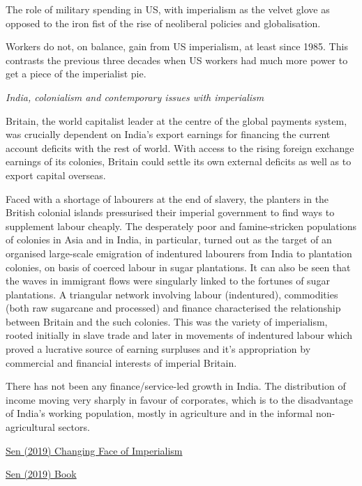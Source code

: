 \documentclass[
]{book}
\begin{document}
The role of military spending in US, with imperialism as the velvet glove as opposed to the iron fist of the rise of neoliberal policies and globalisation.

Workers do not, on balance, gain from US imperialism, at least since 1985. This contrasts the previous three decades when US workers had much more power to get a piece of the imperialist pie.

\emph{India, colonialism and contemporary issues with imperialism}

Britain, the world capitalist leader at the centre of the global payments system, was crucially dependent on India's export earnings for financing the current account deficits with the rest of world. With access to the rising foreign exchange earnings of its colonies, Britain could settle its own external deficits as well as to export capital overseas.

Faced with a shortage of labourers at the end of slavery, the planters in the British colonial islands pressurised their imperial government to find ways to supplement labour cheaply. The desperately poor and famine-stricken populations of colonies in Asia and in India, in particular, turned out as the target of an organised large-scale emigration of indentured labourers from India to plantation colonies, on basis of coerced labour in sugar plantations. It can also be seen that the waves in immigrant flows were singularly linked to the fortunes of sugar plantations. A triangular network involving labour (indentured), commodities (both raw sugarcane and processed) and finance characterised the relationship between Britain and the such colonies. This was the variety of imperialism, rooted initially in slave trade and later in movements of indentured labour which proved a lucrative source of earning surpluses and it's appropriation by commercial and financial interests of imperial Britain.

There has not been any finance/service-led growth in India.
The distribution of income moving very sharply in favour of corporates, which is to the disadvantage of India's working population, mostly in agriculture and in the informal non-agricultural sectors.

\href{https://developingeconomics.org/2021/04/13/the-changing-face-of-imperialism-colonialism-to-contemporary-capitalism/}{Sen (2019) Changing Face of Imperialism}

\href{https://www.routledge.com/The-Changing-Face-of-Imperialism-Colonialism-to-Contemporary-Capitalism/Sen-Marcuzzo/p/book/9780367890704}{Sen (2019) Book}
\end{document}
